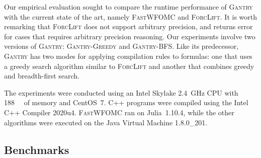\documentclass[a4paper,UKenglish,cleveref, autoref, thm-restate]{lipics-v2021}
\newcommand{\Cranetwo}{\textsc{Gantry}}
\newcommand{\Cranebfs}{\textsc{Gantry-BFS}}
\newcommand{\Cranegreedy}{\textsc{Gantry-Greedy}}
\begin{document}
Our empirical evaluation sought to compare the runtime performance of
{\Cranetwo} with the current state of the art, namely \textsc{FastWFOMC} and
\textsc{ForcLift}. It is worth remarking that \textsc{ForcLift} does not support
arbitrary precision, and returns error for cases that requires arbitrary
precision reasoning. Our experiments involve two versions of \Cranetwo{}:
\Cranegreedy{} and \Cranebfs{}. Like its predecessor, \Cranetwo{} has two modes
for applying compilation rules to formulas: one that uses a greedy search
algorithm similar to \textsc{ForcLift} and another that combines greedy and
breadth-first search.

The experiments were conducted using an Intel Skylake \SI{2.4}{\giga\hertz} CPU
with \SI{188}{\gibi\byte} of memory and CentOS~7. C++ programs were compiled
using the Intel C++ Compiler 2020u4. \textsc{FastWFOMC} ran on Julia~1.10.4,
while the other algorithms were executed on the Java Virtual Machine 1.8.0\_201.




\subsection{Benchmarks}
\end{document}
